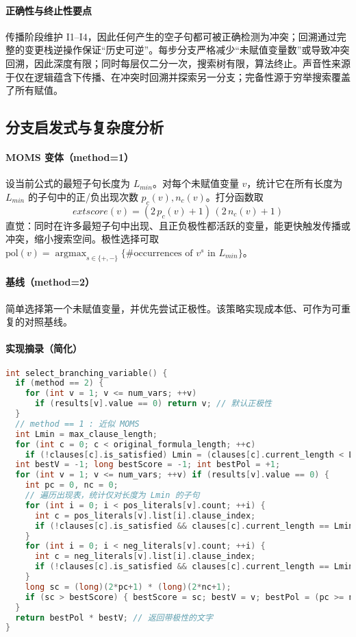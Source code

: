 \documentclass[UTF8]{ctexart}
\begin{document}
\paragraph{正确性与终止性要点}
传播阶段维护 I1--I4，因此任何产生的空子句都可被正确检测为冲突；回溯通过完整的变更栈逆操作保证“历史可逆”。每步分支严格减少“未赋值变量数”或导致冲突回溯，因此深度有限；同时每层仅二分一次，搜索树有限，算法终止。声音性来源于仅在逻辑蕴含下传播、在冲突时回溯并探索另一分支；完备性源于穷举搜索覆盖了所有赋值。

\subsection{分支启发式与复杂度分析}
\paragraph{MOMS 变体（method=1）}
设当前公式的最短子句长度为 \(L_{min}\)。对每个未赋值变量 \(v\)，统计它在所有长度为 \(L_{min}\) 的子句中的正/负出现次数 \(p_c(v), n_c(v)\)。打分函数取
\[
  	ext{score}(v) = (2\,p_c(v)+1)\,(2\,n_c(v)+1)
\]
直觉：同时在许多最短子句中出现、且正负极性都活跃的变量，能更快触发传播或冲突，缩小搜索空间。极性选择可取 \(\text{pol}(v) = \operatorname*{argmax}_{s\in\{+,-\}}\{\#\text{occurrences of } v^s \text{ in } L_{min}\}\)。

\paragraph{基线（method=2）}
简单选择第一个未赋值变量，并优先尝试正极性。该策略实现成本低、可作为可重复的对照基线。

\paragraph{实现摘录（简化）}
\begin{lstlisting}[language=C]
int select_branching_variable() {
  if (method == 2) {
    for (int v = 1; v <= num_vars; ++v)
      if (results[v].value == 0) return v; // 默认正极性
  }
  // method == 1 : 近似 MOMS
  int Lmin = max_clause_length;
  for (int c = 0; c < original_formula_length; ++c)
    if (!clauses[c].is_satisfied) Lmin = (clauses[c].current_length < Lmin) ? clauses[c].current_length : Lmin;
  int bestV = -1; long bestScore = -1; int bestPol = +1;
  for (int v = 1; v <= num_vars; ++v) if (results[v].value == 0) {
    int pc = 0, nc = 0;
    // 遍历出现表，统计仅对长度为 Lmin 的子句
    for (int i = 0; i < pos_literals[v].count; ++i) {
      int c = pos_literals[v].list[i].clause_index;
      if (!clauses[c].is_satisfied && clauses[c].current_length == Lmin) pc++;
    }
    for (int i = 0; i < neg_literals[v].count; ++i) {
      int c = neg_literals[v].list[i].clause_index;
      if (!clauses[c].is_satisfied && clauses[c].current_length == Lmin) nc++;
    }
    long sc = (long)(2*pc+1) * (long)(2*nc+1);
    if (sc > bestScore) { bestScore = sc; bestV = v; bestPol = (pc >= nc) ? +1 : -1; }
  }
  return bestPol * bestV; // 返回带极性的文字
}
\end{lstlisting}
\end{document}
